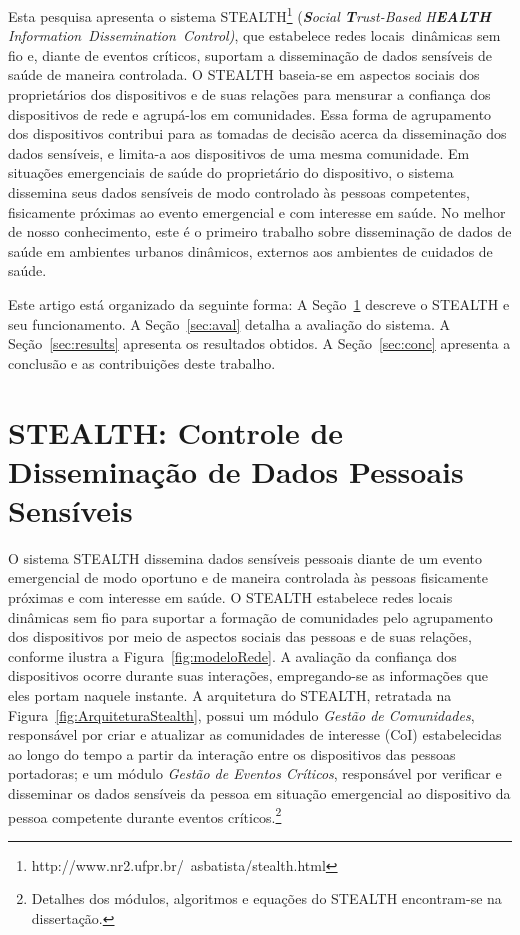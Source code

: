 \documentclass[12pt]{article}
\newcommand{\as}[1]{\textcolor{blue}{{\bf #1}}}
\newcommand{\agn}[1]{\textcolor{auburn}{#1}}
\begin{document}
Esta pesquisa apresenta o sistema \mbox{STEALTH}\footnote{http://www.nr2.ufpr.br/~asbatista/stealth.html} (\textit{\textbf{S}ocial \textbf{T}rust-Based H\textbf{EALTH} \mbox{Information Dissemination Control)}}, que estabelece redes locais~dinâmicas sem fio e, diante de eventos críticos, suportam a disseminação de dados sensíveis de saúde de maneira controlada. O \mbox{STEALTH} baseia-se em aspectos sociais dos proprietários dos dispositivos e de suas relações para mensurar a confiança dos dispositivos de rede e agrupá-los em comunidades. Essa forma de agrupamento dos dispositivos contribui para as tomadas de decisão acerca da disseminação dos dados sensíveis, e limita-a aos dispositivos de uma mesma comunidade. Em  situações emergenciais de saúde do proprietário do dispositivo, o sistema dissemina seus dados sensíveis de modo controlado às pessoas competentes, fisicamente próximas ao evento emergencial e com interesse em saúde. No melhor de nosso conhecimento, este é o primeiro trabalho sobre
disseminação de dados de saúde em ambientes urbanos dinâmicos, externos aos
ambientes de cuidados de saúde.

Este artigo está organizado da seguinte forma: A Seção~\ref{sec:sistema} descreve o \mbox{STEALTH} e seu funcionamento. A Seção~\ref{sec:aval} detalha a avaliação do sistema. A Seção~\ref{sec:results} apresenta os resultados obtidos. A Seção~\ref{sec:conc} apresenta a conclusão e as contribuições deste trabalho.

\vspace{-0.2cm}

\section{STEALTH: Controle de Disseminação de Dados Pessoais Sensíveis} \label{sec:sistema}

O sistema \mbox{STEALTH} dissemina dados sensíveis pessoais diante de um evento emergencial de modo oportuno e de maneira controlada às pessoas fisicamente próximas e com interesse em saúde. O \mbox{STEALTH} estabelece redes locais dinâmicas sem fio para suportar
a formação de comunidades pelo agrupamento dos dispositivos por meio de aspectos sociais das pessoas e de suas relações, conforme ilustra a Figura~\ref{fig:modeloRede}.
A avaliação da confiança dos dispositivos ocorre durante suas interações, empregando-se as informações que eles portam naquele instante. A arquitetura do \mbox{STEALTH}, retratada na Figura~\ref{fig:ArquiteturaStealth}, possui um módulo {\it Gestão de Comunidades}, responsável por criar e atualizar as comunidades de interesse (CoI) estabelecidas ao longo do tempo a partir da interação entre os dispositivos das pessoas portadoras; e um módulo {\it Gestão de Eventos Críticos}, responsável por verificar e disseminar os dados sensíveis da pessoa em situação emergencial ao dispositivo da pessoa competente durante eventos críticos.\footnote{Detalhes dos módulos, algoritmos e equações do  \mbox{STEALTH} encontram-se na dissertação.}
\end{document}
